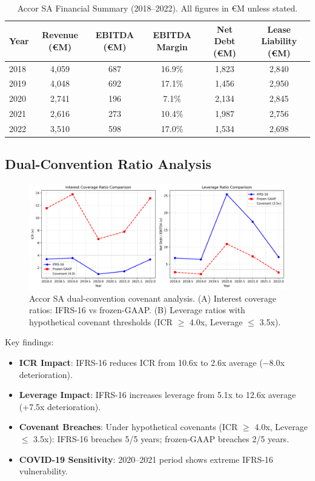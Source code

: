 \documentclass[11pt,a4paper]{article}
\theoremstyle{plain}
\theoremstyle{definition}
\begin{document}
\begin{table}[H]
\centering
\caption{Accor SA Financial Summary (2018--2022). All figures in \euro M unless stated.}
\label{tab:accor_data}
\begin{tabular}{lccccc}
\toprule
Year & Revenue (\euro M) & EBITDA (\euro M) & EBITDA Margin & Net Debt (\euro M) & Lease Liability (\euro M) \\
\midrule
2018 & 4{,}059 & 687 & 16.9\% & 1{,}823 & 2{,}840 \\
2019 & 4{,}048 & 692 & 17.1\% & 1{,}456 & 2{,}950 \\
2020 & 2{,}741 & 196 & 7.1\% & 2{,}134 & 2{,}845 \\
2021 & 2{,}616 & 273 & 10.4\% & 1{,}987 & 2{,}756 \\
2022 & 3{,}510 & 598 & 17.0\% & 1{,}534 & 2{,}698 \\
\bottomrule
\end{tabular}
\end{table}

\subsection{Dual-Convention Ratio Analysis}

\begin{figure}[H]
\centering
\includegraphics[width=\textwidth]{accor_case_study}
\caption{Accor SA dual-convention covenant analysis. (A) Interest coverage ratios: IFRS-16 vs frozen-GAAP. (B) Leverage ratios with hypothetical covenant thresholds (ICR $\ge$ 4.0x, Leverage $\le$ 3.5x).}
\label{fig:accor_ratios}
\end{figure}

Key findings:
\begin{itemize}
\item \textbf{ICR Impact}: IFRS-16 reduces ICR from 10.6x to 2.6x average ($-8.0$x deterioration).
\item \textbf{Leverage Impact}: IFRS-16 increases leverage from 5.1x to 12.6x average (+7.5x deterioration).
\item \textbf{Covenant Breaches}: Under hypothetical covenants (ICR $\ge$ 4.0x, Leverage $\le$ 3.5x): IFRS-16 breaches 5/5 years; frozen-GAAP breaches 2/5 years.
\item \textbf{COVID-19 Sensitivity}: 2020--2021 period shows extreme IFRS-16 vulnerability.
\end{itemize}
\end{document}
